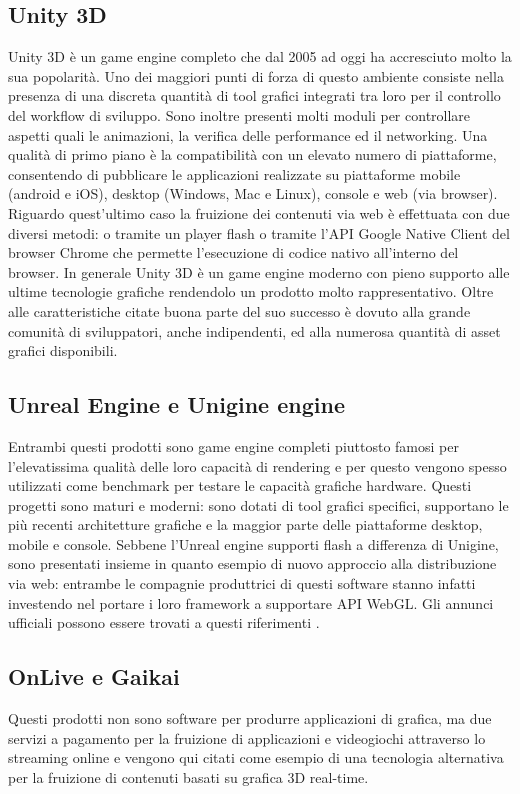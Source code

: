 \subsection{Unity 3D}
Unity 3D \`e un game engine completo che dal 2005 ad oggi ha accresciuto molto la sua popolarit\`a. Uno dei maggiori punti di forza di questo ambiente consiste nella presenza di una discreta quantit\`a di tool grafici integrati tra loro per il controllo del workflow di sviluppo. 
Sono inoltre presenti molti moduli per controllare aspetti quali le animazioni, la verifica delle performance ed il networking.
Una qualit\`a di primo piano \`e la compatibilit\`a con un elevato numero di piattaforme, consentendo di pubblicare le applicazioni realizzate su piattaforme mobile (android e iOS), desktop (Windows, Mac e Linux), console e web (via browser).
Riguardo quest'ultimo caso la fruizione dei contenuti via web \`e effettuata con due diversi metodi: o tramite un player flash o tramite l'\ac{API} Google Native Client del browser Chrome che permette l'esecuzione di codice nativo all'interno del browser.
In generale Unity 3D \`e un game engine moderno con pieno supporto alle ultime tecnologie grafiche rendendolo un prodotto molto rappresentativo.
Oltre alle caratteristiche citate buona parte del suo successo \`e dovuto alla grande comunit\`a di sviluppatori, anche indipendenti, ed alla numerosa quantit\`a di asset grafici disponibili.

\subsection{Unreal Engine e Unigine engine}
Entrambi questi prodotti sono game engine completi piuttosto famosi per l'elevatissima qualit\`a delle loro capacit\`a di rendering e per questo vengono spesso utilizzati come benchmark per testare le capacit\`a grafiche hardware. Questi progetti sono maturi e moderni: sono dotati di tool grafici specifici, supportano le pi\`u recenti architetture grafiche e la maggior parte delle piattaforme desktop, mobile e console.
Sebbene l'Unreal engine supporti flash a differenza di Unigine, sono presentati insieme in quanto esempio di nuovo approccio alla distribuzione via web: entrambe le compagnie produttrici di questi software stanno infatti investendo nel portare i loro framework a supportare \ac{API} WebGL. Gli annunci ufficiali possono essere trovati a questi riferimenti \cite{site:mozillaunrealannounce,site:unigineannounce}.

\subsection{OnLive e Gaikai}
Questi prodotti non sono software per produrre applicazioni di grafica, ma due servizi a pagamento per la fruizione di applicazioni e videogiochi attraverso lo streaming online e vengono qui citati come esempio di una tecnologia alternativa per la fruizione di contenuti basati su grafica 3D real-time. 


